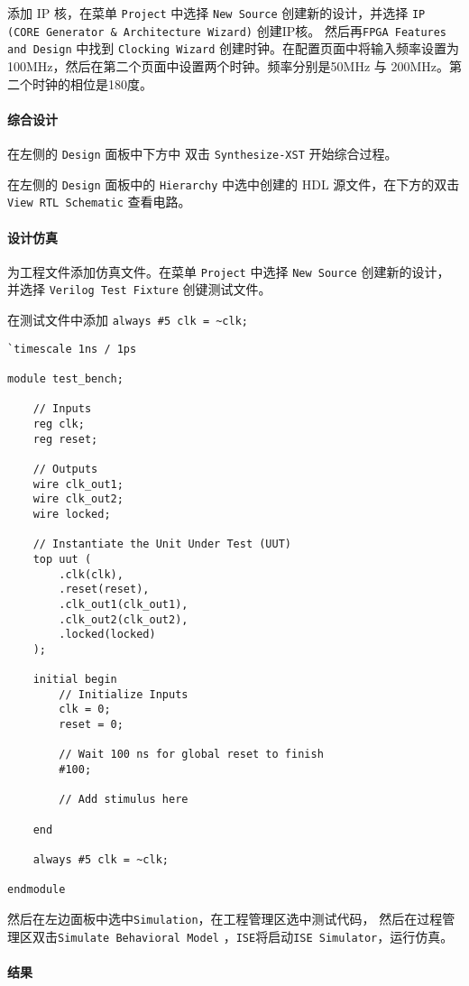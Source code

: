 \documentclass{ctexart}
\begin{document}
        添加 IP 核，在菜单 \verb|Project| 中选择 \verb|New Source| 创建新的设计，并选择 \verb|IP (CORE Generator & Architecture Wizard)| 创建IP核。
        然后再\verb|FPGA Features and Design| 中找到 \verb|Clocking Wizard| 创建时钟。在配置页面中将输入频率设置为100MHz，然后在第二个页面中设置两个时钟。频率分别是50MHz 与 200MHz。第二个时钟的相位是180度。

        \paragraph{综合设计}

        在左侧的 \verb|Design| 面板中下方中 双击 \verb|Synthesize-XST| 开始综合过程。

        在左侧的 \verb|Design| 面板中的 \verb|Hierarchy| 中选中创建的 HDL 源文件，在下方的双击 \verb|View RTL Schematic| 查看电路。

        \paragraph{设计仿真}
        
        为工程文件添加仿真文件。在菜单 \verb|Project| 中选择 \verb|New Source| 创建新的设计，并选择 \verb|Verilog Test Fixture| 创键测试文件。

        在测试文件中添加 \lstinline|always #5 clk = ~clk;|
        \begin{lstlisting}
`timescale 1ns / 1ps

module test_bench;

	// Inputs
	reg clk;
	reg reset;

	// Outputs
	wire clk_out1;
	wire clk_out2;
	wire locked;

	// Instantiate the Unit Under Test (UUT)
	top uut (
		.clk(clk), 
		.reset(reset), 
		.clk_out1(clk_out1), 
		.clk_out2(clk_out2), 
		.locked(locked)
	);

	initial begin
		// Initialize Inputs
		clk = 0;
		reset = 0;

		// Wait 100 ns for global reset to finish
		#100;
 
		// Add stimulus here

	end
	
	always #5 clk = ~clk;
      
endmodule
        \end{lstlisting}

        然后在左边面板中选中\verb|Simulation|，在工程管理区选中测试代码，
        然后在过程管理区双击\verb|Simulate Behavioral Model|
        ，\verb|ISE|将启动\verb|ISE Simulator|，运行仿真。

        \paragraph{结果}

        
\end{document}
